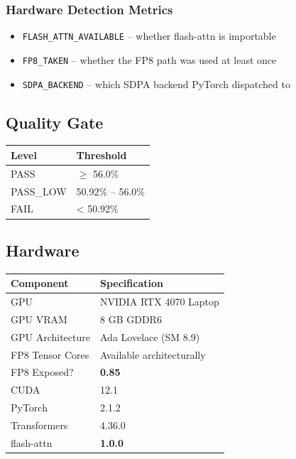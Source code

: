 \subsubsection{Hardware Detection Metrics}

\begin{itemize}
\item \texttt{FLASH\_ATTN\_AVAILABLE} -- whether flash-attn is importable
\item \texttt{FP8\_TAKEN} -- whether the FP8 path was used at least once
\item \texttt{SDPA\_BACKEND} -- which SDPA backend PyTorch dispatched to

\end{itemize}
\subsection{Quality Gate}

\begin{table}[H]
\centering
\small
\begin{tabular}{ll}
\toprule
\textbf{Level} & \textbf{Threshold} \\
\midrule
PASS & $\ge$ 56.0\% \\
PASS\_LOW & 50.92\% -- 56.0\% \\
FAIL & \textless{} 50.92\% \\
\bottomrule
\end{tabular}
\end{table}

\subsection{Hardware}

\begin{table}[H]
\centering
\small
\begin{tabular}{ll}
\toprule
\textbf{Component} & \textbf{Specification} \\
\midrule
GPU & NVIDIA RTX 4070 Laptop \\
GPU VRAM & 8 GB GDDR6 \\
GPU Architecture & Ada Lovelace (SM 8.9) \\
FP8 Tensor Cores & Available architecturally \\
FP8 Exposed? & \textbf{0.85} \\
CUDA & 12.1 \\
PyTorch & 2.1.2 \\
Transformers & 4.36.0 \\
flash-attn & \textbf{1.0.0} \\
\bottomrule
\end{tabular}
\end{table}

